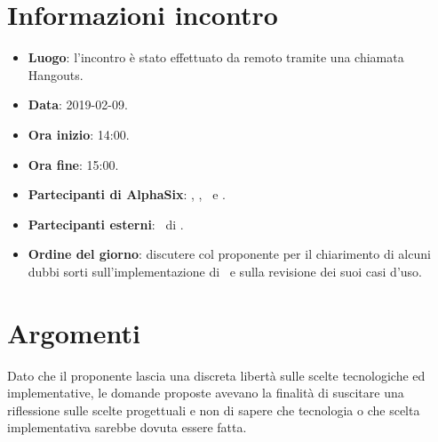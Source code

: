 \newcommand{\documento}{\VE}
\newcommand{\nomedocumentofisico}{VE\_2018-12-12.pdf}
\newcommand{\redazione}{\TG}
\newcommand{\verifica}{\SG}
\newcommand{\approvazione}{\CV}
\newcommand{\versione}{1.0.0}
\newcommand{\uso}{Esterno}
\newcommand{\destinateTo}{\TV, \\ & \RC, \\ & \II}
\newcommand{\datacreazione}{15 dicembre 2018}
\newcommand{\datamodifica}{17 dicembre 2018}
\newcommand{\stato}{Approvato}

\def\TABELLE{false}	%
\def\FIGURE{false} 	%






    

    
    
    \section{Informazioni incontro}
    	\begin{itemize}
    		\item \textbf{Luogo}: l'incontro è stato effettuato da remoto tramite una chiamata Hangouts.
    		\item \textbf{Data}: 2019-02-09.
    		\item \textbf{Ora inizio}: 14:00.
    		\item \textbf{Ora fine}: 15:00.
    		\item \textbf{Partecipanti di AlphaSix}: \NC, \SG, \TG~e \CV.
    		\item \textbf{Partecipanti esterni}: \DZ~di \II.
    		\item \textbf{Ordine del giorno}: discutere col proponente per il chiarimento di alcuni dubbi sorti sull'implementazione di \progetto~e sulla revisione dei suoi casi d'uso.
    	\end{itemize}
    
    \section{Argomenti}
    	Dato che il proponente lascia una discreta libertà sulle scelte tecnologiche ed implementative, le domande proposte avevano la finalità di suscitare una riflessione sulle scelte progettuali e non di sapere che tecnologia o che scelta implementativa sarebbe dovuta essere fatta.
    	
